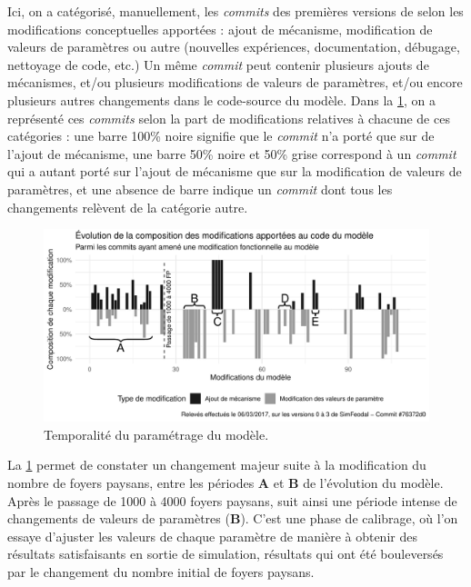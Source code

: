 Ici, on a catégorisé, manuellement, les \textit{commits} des premières versions de \simfeodal{} selon les modifications conceptuelles apportées : ajout de mécanisme, modification de valeurs de paramètres ou autre (nouvelles expériences, documentation, débugage, nettoyage de code, etc.)
Un même \textit{commit} peut contenir plusieurs ajouts de mécanismes, et/ou plusieurs modifications de valeurs de paramètres, et/ou encore plusieurs autres changements dans le code-source du modèle.
Dans la \cref{fig:comits-periodes}, on a représenté ces \textit{commits} selon la part de modifications relatives à chacune de ces catégories : une barre 100\% noire signifie que le \textit{commit} n'a porté que sur de l'ajout de mécanisme, une barre 50\% noire et 50\% grise correspond à un \textit{commit} qui a autant porté sur l'ajout de mécanisme que sur la modification de valeurs de paramètres, et une absence de barre indique un \textit{commit} dont tous les changements relèvent de la catégorie \og autre\fg{}.

\begin{figure}[H]
	\includegraphics[width = \linewidth]{img/plotComits_clean.pdf}
	\caption[Temporalité du paramétrage du modèle.]{Temporalité du paramétrage du modèle.}
	\label{fig:comits-periodes}
\end{figure}

La \cref{fig:comits-periodes} permet de constater un changement majeur suite à la modification du nombre de foyers paysans, entre les périodes \textbf{A} et \textbf{B} de l'évolution du modèle.
Après le passage de 1000 à 4000 foyers paysans, suit ainsi une période intense de changements de valeurs de paramètres (\textbf{B}).
C'est une phase de calibrage, où l'on essaye d'ajuster les valeurs de chaque paramètre de manière à obtenir des résultats satisfaisants en sortie de simulation, résultats qui ont été bouleversés par le changement du nombre initial de foyers paysans.

